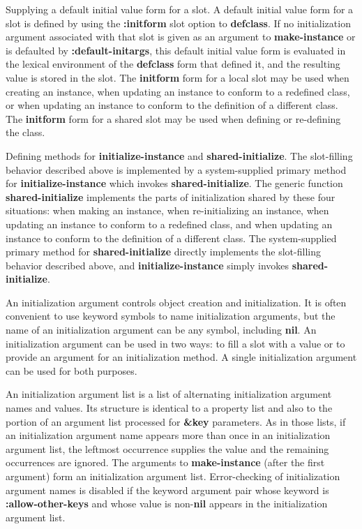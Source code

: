 \item{\bull} Supplying a default initial value form for a slot.  A
default initial value form for a slot is defined by using the {\bf
:initform} slot option to {\bf defclass}.  If no initialization
argument associated with that slot is given as an argument to {\bf
make-instance} or is defaulted by {\bf :default-initargs}, this
default initial value form is evaluated in the lexical environment of
the {\bf defclass} form that defined it, and the resulting value is
stored in the slot.  The {\bf initform} form for a local slot may be
used when creating an instance, when updating an instance to conform
to a redefined class, or when updating an instance to conform to the
definition of a different class. The {\bf initform} form for a shared
slot may be used when defining or re-defining the class.

\item{\bull} Defining methods for {\bf initialize-instance} and {\bf
shared-initialize}.  The slot-filling behavior described above is
implemented by a system-supplied primary method for {\bf
initialize-instance} which invokes {\bf shared-initialize}. The
generic function {\bf shared-initialize} implements the parts of
initialization shared by these four situations: when making an
instance, when re-initializing an instance, when updating an instance
to conform to a redefined class, and when updating an instance to
conform to the definition of a different class. The system-supplied
primary method for {\bf shared-initialize} directly implements the
slot-filling behavior described above, and {\bf initialize-instance}
simply invokes {\bf shared-initialize}.

\endlist


An initialization argument controls object creation and
initialization.  It is often convenient to use keyword symbols to name
initialization arguments, but the name of an initialization argument
can be any symbol, including {\bf nil}.  An initialization argument
can be used in two ways: to fill a slot with a value or to provide an
argument for an initialization method.  A single initialization
argument can be used for both purposes.

An {\bit initialization argument list\/} is a list of alternating
initialization argument names and values.  Its structure is identical
to a property list and also to the portion of an argument list
processed for {\bf \&key} parameters.  As in those lists, if an
initialization argument name appears more than once in an
initialization argument list, the leftmost occurrence supplies the
value and the remaining occurrences are ignored.  The arguments to
{\bf make-instance} (after the first argument) form an initialization
argument list.  Error-checking of initialization argument names is
disabled if the keyword argument pair whose keyword is {\bf
:allow-other-keys} and whose value is non-{\bf nil} appears in the
initialization argument list.


